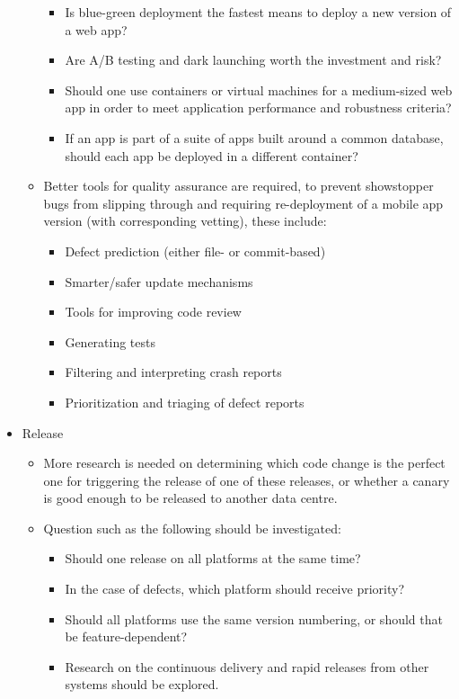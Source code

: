\documentclass[]{book}
\providecommand{\tightlist}{%
  \setlength{\itemsep}{0pt}\setlength{\parskip}{0pt}}
\begin{document}
\begin{itemize}
\begin{itemize}
    \begin{itemize}
    \tightlist
    \item
      Is blue-green deployment the fastest means to deploy a new version
      of a web app?
    \item
      Are A/B testing and dark launching worth the investment and risk?
    \item
      Should one use containers or virtual machines for a medium-sized
      web app in order to meet application performance and robustness
      criteria?
    \item
      If an app is part of a suite of apps built around a common
      database, should each app be deployed in a different container?
    \end{itemize}
  \item
    Better tools for quality assurance are required, to prevent
    showstopper bugs from slipping through and requiring re-deployment
    of a mobile app version (with corresponding vetting), these include:

    \begin{itemize}
    \tightlist
    \item
      Defect prediction (either file- or commit-based)
    \item
      Smarter/safer update mechanisms
    \item
      Tools for improving code review
    \item
      Generating tests
    \item
      Filtering and interpreting crash reports
    \item
      Prioritization and triaging of defect reports
    \end{itemize}
  \end{itemize}
\item
  Release

  \begin{itemize}
  \tightlist
  \item
    More research is needed on determining which code change is the
    perfect one for triggering the release of one of these releases, or
    whether a canary is good enough to be released to another data
    centre.
  \item
    Question such as the following should be investigated:

    \begin{itemize}
    \tightlist
    \item
      Should one release on all platforms at the same time?
    \item
      In the case of defects, which platform should receive priority?
    \item
      Should all platforms use the same version numbering, or should
      that be feature-dependent?
    \item
      Research on the continuous delivery and rapid releases from other
      systems should be explored.
    \end{itemize}
  \end{itemize}
\end{itemize}
\end{document}

